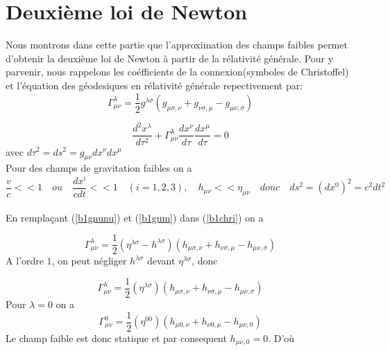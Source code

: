\documentclass[a4paper,12pt]{report}
\theoremstyle{plain}
\theoremstyle{plain}
\begin{document}
\section{Deuxi\`eme loi de Newton}
Nous montrons dans cette partie que l'approximation des champs faibles permet d'obtenir la deuxi\`eme loi de Newton \`a partir de la 
r\'elativit\'e g\'en\'erale.  Pour y parvenir, nous rappelons les co\'efficients de la connexion(symboles de Christoffel) et l'\'equation des g\'eodesiques en r\'elativit\'e 
g\'en\'erale repectivement par:
\begin{equation}\label{b1chri}
 \Gamma^\lambda_{\mu\nu}=\frac{1}{2}g^{\lambda\sigma}(g_{\mu\sigma, \nu}+g_{\nu\sigma, \mu} -g_{\mu\nu, \sigma})
\end{equation}

\begin{equation}\label{b1geo}
 \frac{d^2x^\lambda}{d\tau^2} +\Gamma^\lambda_{\mu\nu}\frac{dx^\nu}{d\tau}\frac{dx^\mu}{d\tau}=0
\end{equation}
avec $d\tau^2=ds^2=g_{\mu\nu} dx^\nu dx^\mu$                         \\
Pour des champs de gravitation faibles on a $$\frac{v}{c}<<1 \quad ou \quad \frac{dx^i}{cdt}<<1 \quad(i=1, 2, 3),   \quad h_{\mu\nu}<<\eta_{\mu\nu}  
  \quad donc  \quad  ds^2=(dx^0)^2= c^2dt^2  $$ \\
En rempla\c{c}ant (\ref{b1gnunu}) et (\ref{b1gum}) dans (\ref{b1chri}) on a


\begin{equation}
 \Gamma^\lambda_{\mu\nu}=\frac{1}{2}( \eta^{\lambda\sigma} - h^{\lambda\sigma})(h_{\mu\sigma, \nu}+h_{\nu\sigma, \mu} -h_{\mu\nu, \sigma}) 
\end{equation}
A l'ordre $1$,  on peut n\'egliger $h^{\lambda\sigma}$ devant $\eta^{\lambda\sigma}$,  donc

\begin{equation}
 \Gamma^\lambda_{\mu\nu}=\frac{1}{2}( \eta^{\lambda\sigma})(h_{\mu\sigma, \nu}+h_{\nu\sigma, \mu} -h_{\mu\nu, \sigma}) 
\end{equation}
Pour $\lambda=0$ on a
\begin{equation}
 \Gamma^0_{\mu\nu}=\frac{1}{2}( \eta^{00})(h_{\mu0, \nu}+h_{\nu0, \mu} -h_{\mu\nu, 0}) 
\end{equation}
Le champ faible est donc statique et par consequent $ h_{\mu\nu, 0}=0$.  D'o\`u 
\end{document}
